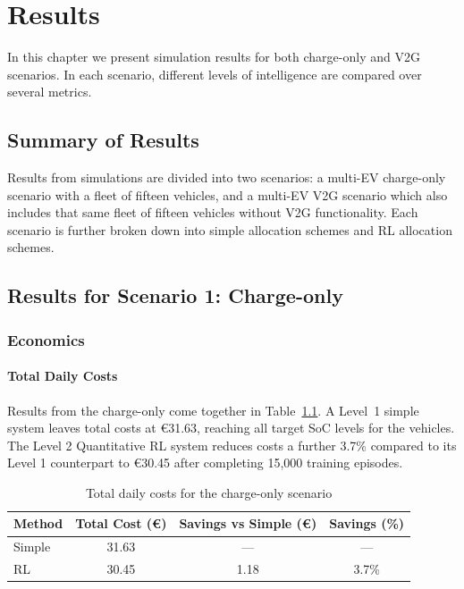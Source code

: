 \chapter{Results}
\label{ch:results}

In this chapter we present simulation results for both charge-only and V2G scenarios. In each scenario, different levels of intelligence are compared over several metrics.

\section{Summary of Results}
\label{sec:results_summary}

Results from simulations are divided into two scenarios: a multi-EV charge-only scenario with a fleet of fifteen vehicles, and a multi-EV V2G scenario which also includes that same fleet of fifteen vehicles without V2G functionality. Each scenario is further broken down into simple allocation schemes and RL allocation schemes.

\section{Results for Scenario 1: Charge-only}
\label{sec:scenario_1_results}

\subsection{Economics}
\label{subsec:scenario_one_econ}

\subsubsection{Total Daily Costs}
Results from the charge-only come together in Table~\ref{tab:charge_only}. A Level~1 simple system leaves total costs at €31.63, reaching all target SoC levels for the vehicles. The Level 2 Quantitative RL system reduces costs a further 3.7\% compared to its Level 1 counterpart to €30.45 after completing 15{,}000 training episodes.

\begin{table}[H]
\centering
\caption{Total daily costs for the charge-only scenario}
\label{tab:charge_only}
\begin{tabular}{@{}lccc@{}}
\toprule
\textbf{Method} & \textbf{Total Cost (€)} & \textbf{Savings vs Simple (€)} & \textbf{Savings (\%)} \\
\midrule
Simple & 31.63 & --- & --- \\
RL & 30.45 & 1.18 & 3.7\% \\
\bottomrule
\end{tabular}
\end{table}

